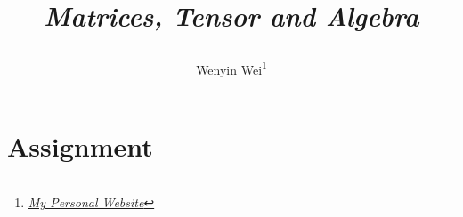 \documentclass[10pt]{article}
\title{\begin{center}{\Huge \textit{Matrices, Tensor and Algebra}}\end{center}}
\author{Wenyin Wei\footnote{\href{https://wenyin.xyz/}{\textit{My Personal Website}}}}
\affiliation{
Tsinghua University\\
Department of Engineering Physics
}
\begin{document}
	\maketitle
	\flushbottom
	\newpage
	\pagestyle{fancynotes}

	\section{Assignment}
	
\end{document}
